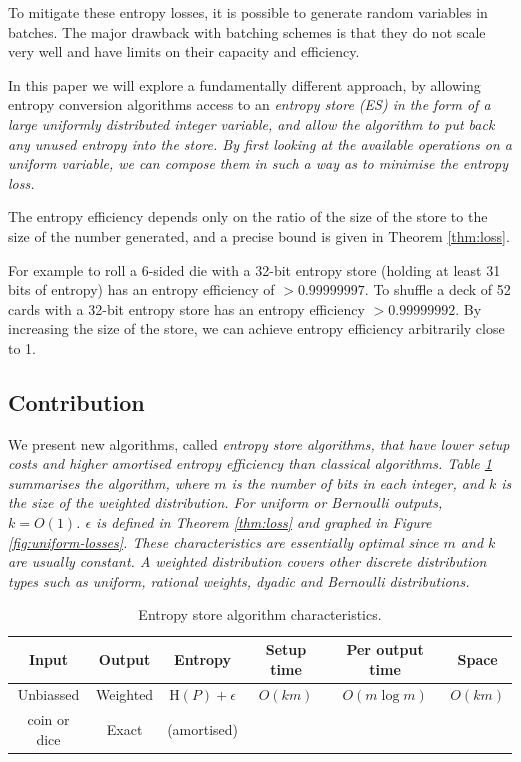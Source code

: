 \documentclass[12pt]{article}
\newcommand{\entropy}[1]{\mathrm{H}(#1)}
\begin{document}
To mitigate these entropy losses, it is possible to generate random variables in batches. The major drawback with batching schemes is that they do not scale very well and have limits on their capacity and efficiency.

In this paper we will explore a fundamentally different approach, by allowing entropy conversion algorithms access to an \em entropy store \em (ES) in the form of a large uniformly distributed integer variable, and allow the algorithm to put back any unused entropy into the store. By first looking at the available operations on a uniform variable, we can compose them in such a way as to minimise the entropy loss.

The entropy efficiency depends only on the ratio of the size of the store to the size of the number generated, and a precise bound is given in Theorem \ref{thm:loss}. 

For example to roll a 6-sided die with a 32-bit entropy store (holding at least 31 bits of entropy) has an entropy efficiency of $>0.99999997$. To shuffle a deck of 52 cards with a 32-bit entropy store has an entropy efficiency $>0.99999992$. By increasing the size of the store, we can achieve entropy efficiency arbitrarily close to 1.


\subsection {Contribution}

We present new algorithms, called \em entropy store algorithms\em, that have lower setup costs and higher amortised entropy efficiency than classical algorithms. Table \ref{tab:entropy-store} summarises the algorithm, where $m$ is the number of bits in each integer, and $k$ is the size of the weighted distribution. For uniform or Bernoulli outputs, $k=O(1)$. $\epsilon$ is defined in Theorem \ref{thm:loss} and graphed in Figure \ref{fig:uniform-losses}. These characteristics are essentially optimal since $m$ and $k$ are usually constant.  A weighted distribution covers other discrete distribution types such as uniform, rational weights, dyadic and Bernoulli distributions.

\begin{table}[h!]
\centering
\begin{tabular}{|c|c|c|c|c|c|}
\hline
Input & Output & Entropy & Setup time & Per output time & Space \\
\hline
Unbiassed & Weighted & $\entropy{P}+\epsilon$ & $O(km)$ & $O(m \log m)$ & $O(km)$ \\
coin or dice & Exact & (amortised) & & &  \\
\hline
\end{tabular}
\caption{Entropy store algorithm characteristics.}
    \label{tab:entropy-store}
\end{table}
\end{document}
